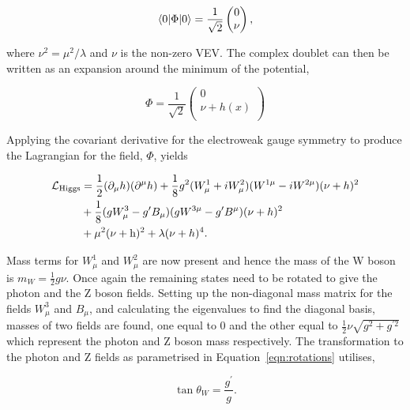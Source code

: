 \begin{equation}
\braket{0|\Phi|0} = \frac{1}{\sqrt{2}}
	\begin{pmatrix} 
		0 \\
		\nu \\
	\end{pmatrix},
\end{equation}

where $\nu^2 = \mu^2 / \lambda$ and $\nu$ is the non-zero \ac{VEV}.
The complex doublet can then be written as an expansion around the minimum of the potential,

\begin{equation}
\Phi = \frac{1}{\sqrt{2}}
	\begin{pmatrix} 
		0 \\
		\nu + h(x)\\
	\end{pmatrix}
\end{equation}

Applying the covariant derivative for the electroweak gauge symmetry to produce the Lagrangian for the field, $\Phi$, yields

\begin{align}
\begin{split}
\mathcal{L}_{\text{Higgs}} &= \frac{1}{2}(\partial_{\mu}h)(\partial^{\mu}h) + \frac{1}{8} g^{2} (W_{\mu}^{1} + i W_{\mu}^{2})(W^{1\mu} - i W^{2\mu})(\nu + h)^2 \\
&+ \frac{1}{8} (g W_{\mu}^{3} - g' B_{\mu})(g W^{3\mu} - g' B^{\mu})(\nu + h)^2  \\
&+ \mu^2 (\nu + {\text{h}})^2 + \lambda (\nu + h)^4.
\end{split}
\end{align}

Mass terms for $W_{\mu}^{1}$ and $W_{\mu}^{2}$ are now present and hence the mass of the W boson is $m_W = \frac{1}{2}g\nu$.
Once again the remaining states need to be rotated to give the photon and the Z boson fields.
Setting up the non-diagonal mass matrix for the fields $W_{\mu}^{3}$ and $B_{\mu}$, and calculating the eigenvalues to find the diagonal basis, masses of two fields are found, one equal to 0 and the other equal to $\frac{1}{2} \nu \sqrt{g^2 + g^{\prime 2}}$ which represent the photon and Z boson mass respectively.
The transformation to the photon and Z fields as parametrised in Equation~\ref{eqn:rotations} utilises,

\begin{equation}
\tan\theta_W = \frac{g^{\prime}}{g}.
\end{equation}


